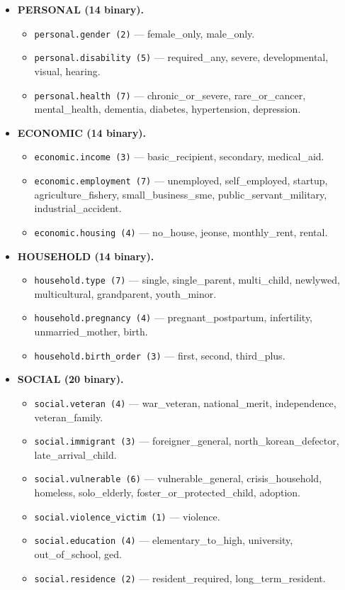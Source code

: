 \documentclass{article}
\begin{document}
\begin{itemize}[leftmargin=*]
\item \textbf{PERSONAL (14 binary).}
  \begin{itemize}[leftmargin=*,nosep]
  \item \texttt{personal.gender (2)} --- female\_only, male\_only.
  \item \texttt{personal.disability (5)} --- required\_any, severe,
        developmental, visual, hearing.
  \item \texttt{personal.health (7)} --- chronic\_or\_severe,
        rare\_or\_cancer, mental\_health, dementia, diabetes,
        hypertension, depression.
  \end{itemize}

\item \textbf{ECONOMIC (14 binary).}
  \begin{itemize}[leftmargin=*,nosep]
  \item \texttt{economic.income (3)} --- basic\_recipient,
        secondary, medical\_aid.
  \item \texttt{economic.employment (7)} --- unemployed,
        self\_employed, startup, agriculture\_fishery,
        small\_business\_sme, public\_servant\_military,
        industrial\_accident.
  \item \texttt{economic.housing (4)} --- no\_house, jeonse,
        monthly\_rent, rental.
  \end{itemize}

\item \textbf{HOUSEHOLD (14 binary).}
  \begin{itemize}[leftmargin=*,nosep]
  \item \texttt{household.type (7)} --- single, single\_parent,
        multi\_child, newlywed, multicultural, grandparent,
        youth\_minor.
  \item \texttt{household.pregnancy (4)} --- pregnant\_postpartum,
        infertility, unmarried\_mother, birth.
  \item \texttt{household.birth\_order (3)} --- first, second,
        third\_plus.
  \end{itemize}

\item \textbf{SOCIAL (20 binary).}
  \begin{itemize}[leftmargin=*,nosep]
  \item \texttt{social.veteran (4)} --- war\_veteran,
        national\_merit, independence, veteran\_family.
  \item \texttt{social.immigrant (3)} --- foreigner\_general,
        north\_korean\_defector, late\_arrival\_child.
  \item \texttt{social.vulnerable (6)} --- vulnerable\_general,
        crisis\_household, homeless, solo\_elderly,
        foster\_or\_protected\_child, adoption.
  \item \texttt{social.violence\_victim (1)} --- violence.
  \item \texttt{social.education (4)} --- elementary\_to\_high,
        university, out\_of\_school, ged.
  \item \texttt{social.residence (2)} --- resident\_required,
        long\_term\_resident.
  \end{itemize}


\end{itemize}
\end{document}

